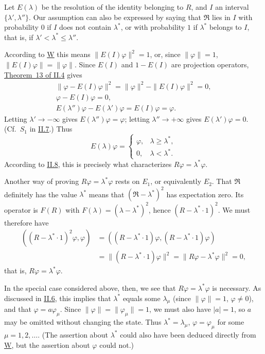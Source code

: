 \documentclass[fontsize=13pt,twoside,openany,headings=normal,parskip=false,bookmarkpackage=false,DIV=calc]{scrbook}
\begin{document}
Let $E(\lambda)$ be the resolution of the identity belonging to $R$, and $I$ an interval $\{\lambda',\lambda''\}$. Our assumption can also be expressed by saying that $\mathfrak R$ lies in $I$ with probability $0$ if $I$ does not contain $\lambda^*$, or with probability $1$ if $\lambda^*$ belongs to $I$, that is, if $\lambda'<\lambda^*\le\lambda''$.

According to \hyperref[post:III.1.W]{W} this means $\|E(I)\varphi\|^2=1$, or, since $\|\varphi\|=1$, $\|E(I)\varphi\|=\|\varphi\|$. Since $E(I)$ and $1-E(I)$ are projection operators, \hyperref[thm:II.13]{Theorem~13 of II.4} gives
\begin{gather*}
\|\varphi-E(I)\varphi\|^2=\|\varphi\|^2-\|E(I)\varphi\|^2=0,\\
\varphi-E(I)\varphi=0,\\
E(\lambda'')\varphi-E(\lambda')\varphi=E(I)\varphi=\varphi.
\end{gather*}
Letting $\lambda'\to-\infty$ gives $E(\lambda'')\varphi=\varphi$; letting $\lambda''\to+\infty$ gives $E(\lambda')\varphi=0$.
\hypertarget{origpage-113}{}%
(Cf.\ $S_1$ in \hyperref[sec:II.7]{II.7}.) Thus
\[
E(\lambda)\varphi=\begin{cases}\varphi,&\lambda\ge\lambda^*,\\0,&\lambda<\lambda^*.\end{cases}
\]
According to \hyperref[sec:II.8]{II.8}, this is precisely what characterizes $R\varphi=\lambda^*\varphi$.

Another way of proving $R\varphi=\lambda^*\varphi$ rests on \hyperref[post:III.1.E1]{$E_1$}, or equivalently \hyperref[post:III.1.E2]{$E_2$}. That $\mathfrak R$ definitely has the value $\lambda^*$ means that $(\mathfrak R-\lambda^*)^2$ has expectation zero. Its operator is $F(R)$ with $F(\lambda)=(\lambda-\lambda^*)^2$, hence $(R-\lambda^*\cdot1)^2$. We must therefore have
\begin{align*}
((R-\lambda^*\cdot1)^2\varphi,\varphi)
&=((R-\lambda^*\cdot1)\varphi,(R-\lambda^*\cdot1)\varphi)\\
&=\|(R-\lambda^*\cdot1)\varphi\|^2
=\|R\varphi-\lambda^*\varphi\|^2=0,
\end{align*}
that is, $R\varphi=\lambda^*\varphi$.

In the special case considered above, then, we see that $R\varphi=\lambda^*\varphi$ is necessary. As discussed in \hyperref[sec:II.6]{II.6}, this implies that $\lambda^*$ equals some $\lambda_\mu$ (since $\|\varphi\|=1$, $\varphi\ne0$), and that $\varphi=a\varphi_\mu$. Since $\|\varphi\|=\|\varphi_\mu\|=1$, we must also have $|a|=1$, so $a$ may be omitted without changing the state. Thus $\lambda^*=\lambda_\mu$, $\varphi=\varphi_\mu$ for some $\mu=1,2,\ldots$. (The assertion about $\lambda^*$ could also have been deduced directly from \hyperref[post:III.1.W]{W}, but the assertion about $\varphi$ could not.)
\end{document}
